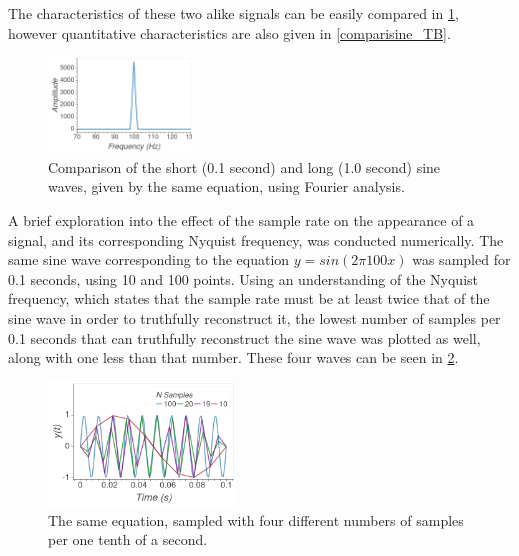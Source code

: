 \documentclass[aps,prl,reprint]{revtex4-2}
\begin{document}
The characteristics of these two alike signals can be easily compared in 
\ref{comparisine_FD}, however quantitative characteristics are also given in 
\ref{comparisine_TB}. 

\begin{figure}[h]
\includegraphics[width=0.34\textwidth]{../Images/l5_A_2b.png}
\caption{\label{comparisine_FD} Comparison of the short (0.1 second) and long
(1.0 second) sine waves, given by the same equation, using Fourier analysis.}
\end{figure}

A brief exploration into the effect of the sample rate on the appearance of
a signal, and its corresponding Nyquist frequency, was conducted numerically.
The same sine wave corresponding to the equation $y=sin(2\pi 100 x)$ was
sampled for 0.1 seconds, using 10 and 100 points. Using an understanding
of the Nyquist frequency, which states that the sample rate must be at least
twice that of the sine wave in order to truthfully reconstruct it, the
lowest number of samples per 0.1 seconds that can truthfully reconstruct the
sine wave was plotted as well, along with one less than that number. These four
waves can be seen in \ref{waves}.

\begin{figure}[h]
\includegraphics[width=0.44\textwidth]{../Images/l5_optional.png}
\caption{\label{waves} The same equation, sampled with four different numbers
of samples per one tenth of a second.}
\end{figure}
\end{document}
